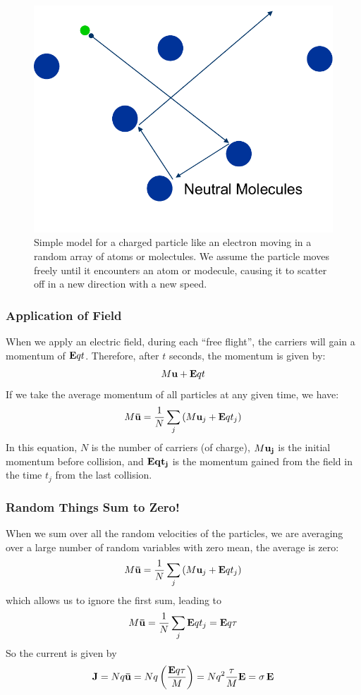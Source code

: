 \begin{figure}
\begin{center}
\includegraphics[width=.4\columnwidth]{slide8}
\end{center}
\caption{Simple model for a charged particle like an electron moving in a random array of atoms or molectules.  We assume the particle moves freely until it encounters an atom or modecule, causing it to scatter off in a new direction with a new speed. } \label{fig:slide8}
\end{figure}


\subsubsection{Application of Field}
When we apply an electric field, during each “free flight”, the carriers will gain a momentum of $ {\bf{E}}qt $.  Therefore, after $t$ seconds, the momentum is given by:
\begin{equation}
        M{\bf{u}} + {\bf{E}}qt
\end{equation}
If we take the average momentum of all particles at any given time, we have:
\begin{equation}
        M{\bf{\bar u}} = \frac{1}{N}\sum\limits_j {\left( {M{{\bf{u}}_j} + {\bf{E}}q{t_j}} \right)}
\end{equation}
In this equation, $ N $ is the number of carriers (of charge), $ M \bf{u}_j $ is the initial momentum before collision, and $\bf{E}q{t_j}$ is the momentum gained from the field in the time $t_j$ from the last collision.




\subsubsection{Random Things Sum to Zero!}
When we sum over all the random velocities of the particles, we are averaging over a large number of random variables with zero mean, the average is zero:
\begin{equation}
        M{\bf{\bar u}} = \frac{1}{N}\sum\limits_j {\left( {M{{\bf{u}}_j} + {\bf{E}}q{t_j}} \right)}
\end{equation}
which allows us to ignore the first sum, leading to
\begin{equation}
        M{\bf{\bar u}} = \frac{1}{N}\sum\limits_j {{\bf{E}}q{t_j}}  = {\bf{E}}q\tau
\end{equation}
So the current is given by
\begin{equation} {\bf{J}} = Nq{\bf{\bar u}} = Nq\left( {\frac{{{\bf{E}}q\tau }}{M}} \right) = N{q^2}\frac{\tau }{M}{\bf{E}} = \sigma \,{\bf{E}}
\end{equation}








